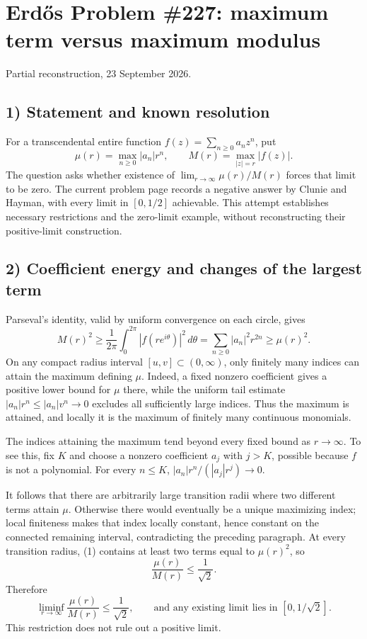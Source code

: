 \section{Erd\H{o}s Problem \#227: maximum term versus maximum modulus}
\noindent Partial reconstruction, 23 September 2026.

\subsection*{1) Statement and known resolution}
For a transcendental entire function $f(z)=\sum_{n\ge0}a_nz^n$, put
\[
 \mu(r)=\max_{n\ge0}|a_n|r^n,\qquad
 M(r)=\max_{|z|=r}|f(z)|.
\]
The question asks whether existence of $\lim_{r\to\infty}\mu(r)/M(r)$ forces that limit to be zero. The current problem page records a negative answer by Clunie and Hayman, with every limit in $[0,1/2]$ achievable. This attempt establishes necessary restrictions and the zero-limit example, without reconstructing their positive-limit construction.

\subsection*{2) Coefficient energy and changes of the largest term}
Parseval's identity, valid by uniform convergence on each circle, gives
\[
 M(r)^2\ge\frac1{2\pi}\int_0^{2\pi}|f(re^{i\theta})|^2\,d\theta
 =\sum_{n\ge0}|a_n|^2r^{2n}\ge\mu(r)^2.\tag{1}
\]
On any compact radius interval $[u,v]\subset(0,\infty)$, only finitely many indices can attain the maximum defining $\mu$. Indeed, a fixed nonzero coefficient gives a positive lower bound for $\mu$ there, while the uniform tail estimate $|a_n|r^n\le |a_n|v^n\to0$ excludes all sufficiently large indices. Thus the maximum is attained, and locally it is the maximum of finitely many continuous monomials.

The indices attaining the maximum tend beyond every fixed bound as $r\to\infty$. To see this, fix $K$ and choose a nonzero coefficient $a_j$ with $j>K$, possible because $f$ is not a polynomial. For every $n\le K$, $|a_n|r^n/(|a_j|r^j)\to0$.

It follows that there are arbitrarily large transition radii where two different terms attain $\mu$. Otherwise there would eventually be a unique maximizing index; local finiteness makes that index locally constant, hence constant on the connected remaining interval, contradicting the preceding paragraph. At every transition radius, (1) contains at least two terms equal to $\mu(r)^2$, so
\[
 \frac{\mu(r)}{M(r)}\le\frac1{\sqrt2}.
\]
Therefore
\[
 \liminf_{r\to\infty}\frac{\mu(r)}{M(r)}\le\frac1{\sqrt2},
 \qquad \text{and any existing limit lies in }[0,1/\sqrt2].\tag{2}
\]
This restriction does not rule out a positive limit.

